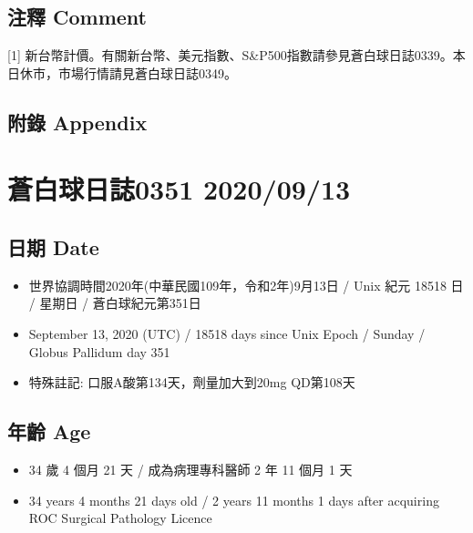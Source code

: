 \documentclass[
]{article}
\providecommand{\tightlist}{%
  \setlength{\itemsep}{0pt}\setlength{\parskip}{0pt}}
\begin{document}
\hypertarget{ux6ce8ux91cb-comment-11}{%
\subsection{注釋 Comment}\label{ux6ce8ux91cb-comment-11}}

{[}1{]}
新台幣計價。有關新台幣、美元指數、S\&P500指數請參見蒼白球日誌0339。本日休市，市場行情請見蒼白球日誌0349。

\hypertarget{ux9644ux9304-appendix-11}{%
\subsection{附錄 Appendix}\label{ux9644ux9304-appendix-11}}

\hypertarget{ux84bcux767dux7403ux65e5ux8a8c0351-20200913}{%
\section{蒼白球日誌0351
2020/09/13}\label{ux84bcux767dux7403ux65e5ux8a8c0351-20200913}}

\hypertarget{ux65e5ux671f-date-12}{%
\subsection{日期 Date}\label{ux65e5ux671f-date-12}}

\begin{itemize}
\tightlist
\item
  世界協調時間2020年(中華民國109年，令和2年)9月13日 / Unix 紀元 18518 日
  / 星期日 / 蒼白球紀元第351日
\item
  September 13, 2020 (UTC) / 18518 days since Unix Epoch / Sunday /
  Globus Pallidum day 351
\item
  特殊註記: 口服A酸第134天，劑量加大到20mg QD第108天
\end{itemize}

\hypertarget{ux5e74ux9f61-age-12}{%
\subsection{年齡 Age}\label{ux5e74ux9f61-age-12}}

\begin{itemize}
\tightlist
\item
  34 歲 4 個月 21 天 / 成為病理專科醫師 2 年 11 個月 1 天
\item
  34 years 4 months 21 days old / 2 years 11 months 1 days after
  acquiring ROC Surgical Pathology Licence
\end{itemize}
\end{document}
